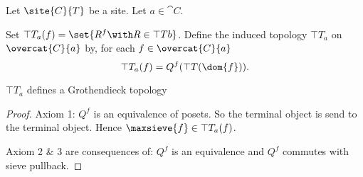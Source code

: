 \begin{definition}
Let $\site{C}{T}$ be a site.
Let $a \in \cat{C}$.

Set $\top{T}_a(f) = \set{ R^f \with R \in \top{T}{b}}$.
Define the induced topology $\top{T}_a$ on $\overcat{C}{a}$
by, for each $f \in \overcat{C}{a}$
\[\top{T}_a(f) = Q^f(\top{T}(\dom{f})).\]
\end{definition}

\begin{lemma}
$\top{T}_a$ defines a Grothendieck topology
\end{lemma}

\begin{proof}
Axiom 1: $Q^f$ is an equivalence of posets. 
So the terminal object is send to the terminal object.
Hence $\maxsieve{f}\in \top{T}_a(f)$.

Axiom 2 \& 3 are consequences of: $Q^f$ is an equivalence and $Q^f$ commutes with sieve pullback.
\end{proof}








